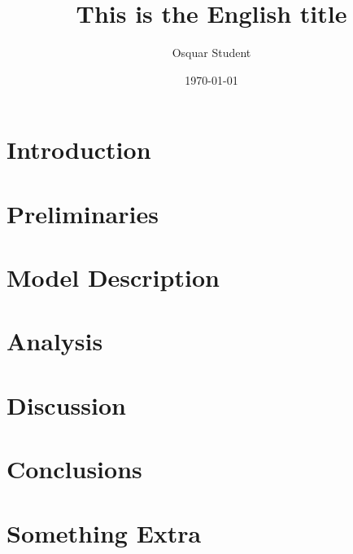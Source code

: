 \documentclass{kththesis}
\title{This is the English title}
\author{Osquar Student}
\date{\today}
\begin{document}
\frontmatter

\titlepage

\begin{abstract}
 
\end{abstract}


\begin{otherlanguage}{swedish}
  \begin{abstract}
     
  \end{abstract}
\end{otherlanguage}


\tableofcontents

\mainmatter

\chapter{Introduction}


\chapter{Preliminaries}


\chapter{Model Description}


\chapter{Analysis}


\chapter{Discussion}
\blindtext

\chapter{Conclusions}
\blindtext

\printbibliography[heading=bibintoc]

\appendix

\chapter{Something Extra}

\tailmatter
\end{document}
